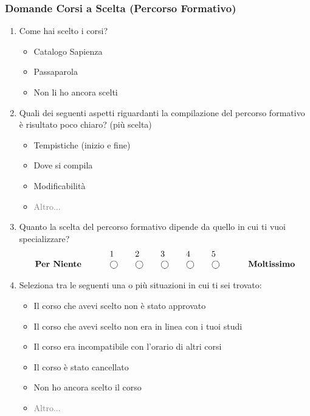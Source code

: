 \subsubsection{Domande Corsi a Scelta (Percorso Formativo)}
\begin{enumerate}
    \item Come hai scelto i corsi?
    \begin{itemize}
        \item Catalogo Sapienza
        \item Passaparola
        \item Non li ho ancora scelti
    \end{itemize}
    \item Quali dei seguenti aspetti riguardanti la compilazione del percorso formativo è risultato poco chiaro? (più scelta)
    \begin{itemize}
        \item Tempistiche (inizio e fine)
        \item Dove si compila
        \item Modificabilità
        \item \textcolor{gray}{Altro...}
    \end{itemize}

    \item Quanto la scelta del percorso formativo dipende da quello in cui ti vuoi specializzare?
    \begin{equation*}
        \begin{array}{lllllll}
                        &  1 & 2 & 3 & 4 & 5 & \\
    \text { \textbf{Per Niente} } \quad \quad & \bigcirc \quad& \bigcirc \quad& \bigcirc \quad& \bigcirc \quad& \bigcirc \quad& \quad \text { \textbf{Moltissimo} }
        \end{array}
    \end{equation*}

    \item Seleziona tra le seguenti una o più situazioni in cui ti sei trovato:
    \begin{itemize}
        \item Il corso che avevi scelto non è stato approvato
        \item Il corso che avevi scelto non era in linea con i tuoi studi
        \item Il corso era incompatibile con l'orario di altri corsi
        \item Il corso è stato cancellato
        \item Non ho ancora scelto il corso
        \item \textcolor{gray}{Altro...}
    \end{itemize}


\end{enumerate}
